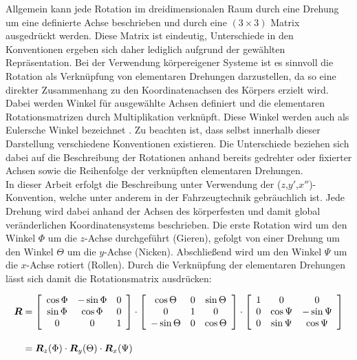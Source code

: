 
Allgemein kann jede Rotation im dreidimensionalen Raum durch eine Drehung um eine definierte Achse beschrieben und durch eine $(3 \times 3)$ Matrix ausgedrückt werden. Diese Matrix ist eindeutig, Unterschiede in den Konventionen ergeben sich daher lediglich aufgrund der gewählten Repräsentation. Bei der Verwendung körpereigener Systeme ist es sinnvoll die Rotation als Verknüpfung von elementaren Drehungen darzustellen, da so eine direkter Zusammenhang zu den Koordinatenachsen des Körpers erzielt wird. Dabei werden Winkel für ausgewählte Achsen definiert und die elementaren Rotationsmatrizen durch Multiplikation verknüpft. Diese Winkel werden auch als Eulersche Winkel bezeichnet \cite{Foley1990}. Zu beachten ist, dass selbst innerhalb dieser Darstellung verschiedene Konventionen existieren. Die Unterschiede beziehen sich dabei auf die Beschreibung der Rotationen anhand bereits gedrehter oder fixierter Achsen sowie die Reihenfolge der verknüpften elementaren Drehungen.\\

In dieser Arbeit erfolgt die Beschreibung unter Verwendung der ($z$,$y'$,$x''$)-Konvention, welche unter anderem in der Fahrzeugtechnik gebräuchlich ist. Jede Drehung wird dabei anhand der Achsen des körperfesten und damit global veränderlichen Koordinatensystems beschrieben. Die erste Rotation wird um den Winkel $\Phi$ um die $z$-Achse durchgeführt (Gieren), gefolgt von einer Drehung um den Winkel $\Theta$ um die $y$-Achse (Nicken). Abschließend wird um den Winkel $\Psi$ um die $x$-Achse rotiert (Rollen). Durch die Verknüpfung der elementaren Drehungen lässt sich damit die Rotationsmatrix ausdrücken:

\begin{equation}
\begin{split}
\mbox{\boldmath{$R$}} & = \left[ \begin{array}{ccc}  \cos{\Phi} & -\sin{\Phi} & 0 \\ \sin{\Phi} & \cos{\Phi} & 0 \\ 0 & 0 & 1  \end{array} \right] \cdot \left[ \begin{array}{ccc}  \cos{\Theta} & 0 & \sin{\Theta} \\ 0 & 1 & 0 \\ -\sin{\Theta} & 0 & \cos{\Theta}  \end{array} \right] \cdot \left[ \begin{array}{ccc}  1 & 0 & 0 \\ 0 & \cos{\Psi} & -\sin{\Psi} \\ 0 & \sin{\Psi} & \cos{\Psi}  \end{array} \right] \\[1em]
& = \mbox{\boldmath{$R$}}_z(\Phi) \cdot \mbox{\boldmath{$R$}}_y(\Theta) \cdot \mbox{\boldmath{$R$}}_x(\Psi)
\end{split}
\end{equation}




